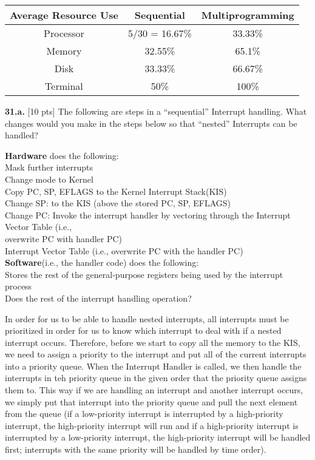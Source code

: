 \documentclass[12pt]{article}
\newcommand\tab[1][1cm]{\hspace*{#1}}
\begin{document}
\begin{center}
\begin{tabular}{| c || c | c |}
\hline
Average Resource Use & Sequential & Multiprogramming\\
\hline\hline
Processor & 5/30 = 16.67\% & 33.33\%\\
\hline
Memory & 32.55\% & 65.1\%\\
\hline
Disk & 33.33\% & 66.67\%\\
\hline
Terminal & 50\% & 100\%\\
\hline
\end{tabular}
\end{center}

\bigskip

{\bf 31.a.} [10 pts] The following are steps in a “sequential” Interrupt handling. What changes would you make in the steps below so that “nested” Interrupts can be handled?

\noindent
{\bf Hardware} does the following:\\
\tab Mask further interrupts\\
\tab Change mode to Kernel\\
\tab Copy PC, SP, EFLAGS to the Kernel Interrupt Stack(KIS)\\
\tab Change SP: to the KIS (above the stored PC, SP, EFLAGS)\\
\tab Change PC: Invoke the interrupt handler by vectoring through the Interrupt Vector Table (i.e.,\\ \tab overwrite PC with handler PC)\\
\tab Interrupt Vector Table (i.e., overwrite PC with the handler PC)\\

\noindent
{\bf Software}(i.e., the handler code) does the following:\\
\tab Stores the rest of the general-purpose registers being used by the interrupt process\\
\tab Does the rest of the interrupt handling operation? 

In order for us to be able to handle nested interrupts, all interrupts must be prioritized in order for us to know which interrupt to deal with if a nested interrupt occurs. Therefore, before we start to copy all the memory to the KIS, we need to assign a priority to the interrupt and put all of the current interrupts into a priority queue. When the Interrupt Handler is called, we then handle the interrupts in teh priority queue in the given order that the priority queue assigns them to. This way if we are handling an interrupt and another interrupt occurs, we simply put that interrupt into the priority queue and pull the next element from the queue (if a low-priority interrupt is interrupted by a high-priority interrupt, the high-priority interrupt will run and if a high-priority interrupt is interrupted by a low-priority interrupt, the high-priority interrupt will be handled first; interrupts with the same priority will be handled by time order). 
\end{document}
